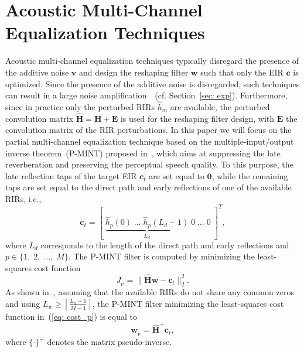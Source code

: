 \documentclass{aes60i}
\begin{document}
\section{Acoustic Multi-Channel Equalization Techniques}
\label{sec: ame}

Acoustic multi-channel equalization techniques typically disregard the presence of the additive noise $\mathbf{v}$ and design the reshaping filter $\mathbf{w}$ such that only the EIR $\mathbf{c}$ is optimized. 
Since the presence of the additive noise is disregarded, such techniques can result in a large noise amplification~\cite{Kodrasi_ITASLP_2013}~(cf. Section~\ref{sec: exp}).
Furthermore, since in practice only the perturbed RIRs $\hat{h}_m$ are available, the perturbed convolution matrix $\hat{\mathbf{H}} = \mathbf{H} + \mathbf{E}$ is used for the reshaping filter design, with $\mathbf{E}$ the convolution matrix of the RIR perturbations.
\newline
In this paper we will focus on the partial multi-channel equalization technique based on the multiple-input/output inverse theorem~(P-MINT) proposed in~\cite{Kodrasi_ITASLP_2013}, which aims at suppressing the late reverberation and preserving the perceptual speech quality. 
To this purpose, the late reflection taps of the target EIR $\mathbf{c}_t$ are set equal to $\mathbf{0}$, while the remaining taps are set equal to the direct path and early reflections of one of the available RIRs, i.e., 
\begin{equation}
\mathbf{c}_t = [\; \underbrace{\hat{h}_p(0) \; \ldots \; \hat{h}_p(L_d-1)}_{L_d} \; 0 \; \ldots \; 0 \; ]^{T},
\end{equation}
where $L_d$ corresponds to the length of the direct path and early reflections and $p \in \{1, \; 2, \; \ldots, \; M \}$.
The P-MINT filter is computed by minimizing the least-squares cost function
\begin{equation}
\label{eq: cost_p}
J_{_{\text{P}}} = \|\hat{\mathbf{H}}\mathbf{w} - \mathbf{c}_t \|_2^2.
\end{equation}
As shown in~\cite{Miyoshi_ITASS_1988}, assuming that the available RIRs do not share any common zeros and using $L_w \geq \left\lceil{\frac{L_h-1}{M-1}}\right\rceil$, the P-MINT filter minimizing the least-squares cost function in~(\ref{eq: cost_p}) is equal to
\begin{equation}
\label{eq: w_pmint}
\mathbf{w}_{_{\text{P}}} = \hat{\mathbf{H}}^+\mathbf{c}_t,
\end{equation}
where $\{ \cdot \}^+$ denotes the matrix pseudo-inverse. 
\end{document}
